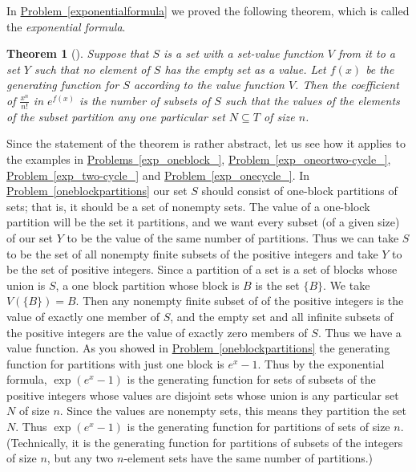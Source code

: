 \documentclass[10pt,]{book}
\theoremstyle{plain}
\newtheorem{theorem}{Theorem}[section]
\theoremstyle{definition}
\theoremstyle{definition}
\numberwithin{equation}{chapter}
\begin{document}
In \hyperref[exponentialformula]{Problem~\ref{exponentialformula}} we proved the following theorem, which is called the \emph{exponential formula}.%
\begin{theorem}[{}]\label{theorem-14}
Suppose that \(S\) is a set with a set-value function \(V\) from it to a set \(Y\) such that no element of \(S\) has the empty set as a value. Let \(f(x)\) be the generating function for \(S\) according to the value function \(V\). Then the coefficient of \(\frac{x^n}{n!}\) in \(e^{f(x)}\) is the number of subsets of \(S\) such that the values of the elements of the subset partition any one particular set \(N\subseteq T\) of size \(n\).%
\end{theorem}
Since the statement of the theorem is rather abstract, let us see how it applies to the examples in \hyperref[exp_oneblock_]{Problems~\ref{exp_oneblock_}}, \hyperref[exp_oneortwo-cycle_]{Problem~\ref{exp_oneortwo-cycle_}}, \hyperref[exp_two-cycle_]{Problem~\ref{exp_two-cycle_}} and \hyperref[exp_onecycle_]{Problem~\ref{exp_onecycle_}}. In \hyperref[oneblockpartitions]{Problem~\ref{oneblockpartitions}} our set \(S\) should consist of one-block partitions of sets; that is, it should be a set of nonempty sets. The value of a one-block partition will be the set it partitions, and we want every subset (of a given size) of our set \(Y\) to be the value of the same number of partitions. Thus we can take \(S\) to be the set of all nonempty finite subsets of the positive integers and take \(Y\) to be the set of positive integers. Since a partition of a set is a set of blocks whose union is \(S\), a one block partition whose block is \(B\) is the set \(\{B\}\). We take \(V(\{B\}) =B\). Then any nonempty finite subset of of the positive integers is the value of exactly one member of \(S\), and the empty set and all infinite subsets of the positive integers are the value of exactly zero members of \(S\). Thus we have a value function. As you showed in \hyperref[oneblockpartitions]{Problem~\ref{oneblockpartitions}} the generating function for partitions with just one block is \(e^x-1\). Thus by the exponential formula, \(\exp(e^x-1)\) is the generating function for sets of subsets of the positive integers whose values are disjoint sets whose union is any particular set \(N\) of size \(n\). Since the values are nonempty sets, this means they partition the set \(N\). Thus \(\exp(e^x-1)\) is the generating function for partitions of sets of size \(n\). (Technically, it is the generating function for partitions of subsets of the integers of size \(n\), but any two \(n\)-element sets have the same number of partitions.)%
\end{document}
